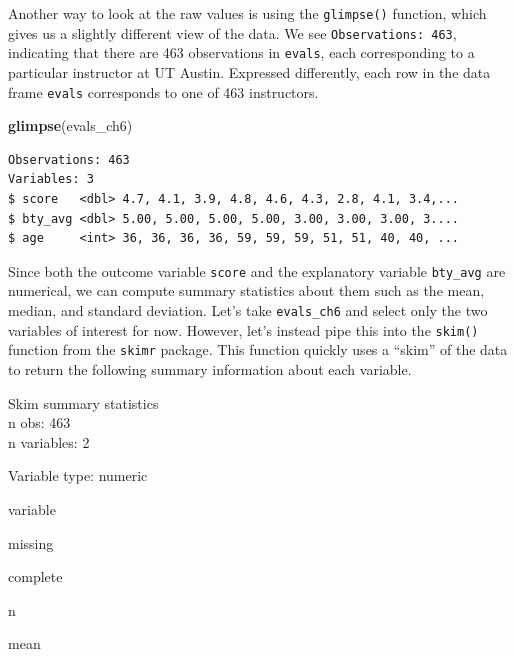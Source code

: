 \documentclass[12pt,]{krantz}
\makeatletter
\newenvironment{Shaded}{\begin{snugshade}}{\end{snugshade}}
\newcommand{\KeywordTok}[1]{\textcolor[rgb]{0.27,0.27,0.27}{\textbf{#1}}}
\newcommand{\StringTok}[1]{\textcolor[rgb]{0.5,0.5,0.5}{#1}}
\newcommand{\OperatorTok}[1]{\textcolor[rgb]{0.43,0.43,0.43}{\textbf{#1}}}
\newcommand{\NormalTok}[1]{#1}
\newenvironment{kframe}{%
\medskip{}
\setlength{\fboxsep}{.8em}
 \def\at@end@of@kframe{}%
 \ifinner\ifhmode%
  \def\at@end@of@kframe{\end{minipage}}%
  \begin{minipage}{\columnwidth}%
 \fi\fi%
 \def\FrameCommand##1{\hskip\@totalleftmargin \hskip-\fboxsep
 \colorbox{shadecolor}{##1}\hskip-\fboxsep
     \hskip-\linewidth \hskip-\@totalleftmargin \hskip\columnwidth}%
 \MakeFramed {\advance\hsize-\width
   \@totalleftmargin\z@ \linewidth\hsize
   \@setminipage}}%
 {\par\unskip\endMakeFramed%
 \at@end@of@kframe}
\renewenvironment{Shaded}{\begin{kframe}}{\end{kframe}}
\makeatother
\begin{document}
Another way to look at the raw values is using the \texttt{glimpse()}
function, which gives us a slightly different view of the data. We see
\texttt{Observations:\ 463}, indicating that there are 463 observations
in \texttt{evals}, each corresponding to a particular instructor at UT
Austin. Expressed differently, each row in the data frame \texttt{evals}
corresponds to one of 463 instructors.

\begin{Shaded}
\begin{Highlighting}[]
\KeywordTok{glimpse}\NormalTok{(evals_ch6)}
\end{Highlighting}
\end{Shaded}

\begin{verbatim}
Observations: 463
Variables: 3
$ score   <dbl> 4.7, 4.1, 3.9, 4.8, 4.6, 4.3, 2.8, 4.1, 3.4,...
$ bty_avg <dbl> 5.00, 5.00, 5.00, 5.00, 3.00, 3.00, 3.00, 3....
$ age     <int> 36, 36, 36, 36, 59, 59, 59, 51, 51, 40, 40, ...
\end{verbatim}

Since both the outcome variable \texttt{score} and the explanatory
variable \texttt{bty\_avg} are numerical, we can compute summary
statistics about them such as the mean, median, and standard deviation.
Let's take \texttt{evals\_ch6} and select only the two variables of
interest for now. However, let's instead pipe this into the
\texttt{skim()} function from the \texttt{skimr} package. This function
quickly uses a ``skim'' of the data to return the following summary
information about each variable.

\begin{Shaded}
\end{Shaded}

Skim summary statistics\\
n obs: 463\\
n variables: 2

Variable type: numeric

variable

missing

complete

n

mean
\end{document}
